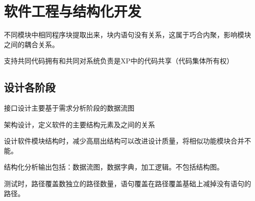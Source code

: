 \documentclass[UTF8]{article}
\begin{document}
\section{软件工程与结构化开发}

不同模块中相同程序块提取出来，块内语句没有关系，这属于巧合内聚，影响模块之间的耦合关系。


支持共同代码拥有和共同对系统负责是XP中的代码共享（代码集体所有权）


\subsection{设计各阶段}


接口设计主要基于需求分析阶段的数据流图

架构设计，定义软件的主要结构元素及之间的关系

设计软件模块结构时，减少高扇出结构可以改进设计质量，将相似功能模块合并不能。

结构化分析输出包括：数据流图，数据字典，加工逻辑。不包括结构图。




测试时，路径覆盖数独立的路径数量，语句覆盖在路径覆盖基础上减掉没有语句的路径。
\end{document}
